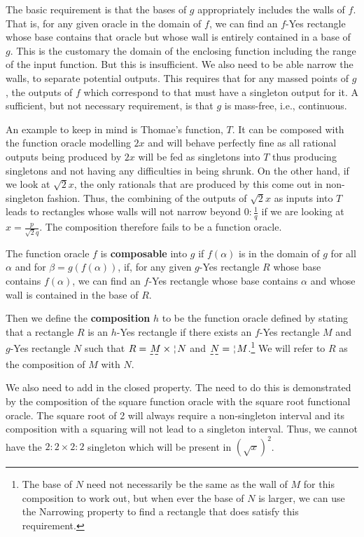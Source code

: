 \documentclass[12pt]{article}
\begin{document}
The basic requirement is that the bases of $g$ appropriately includes the walls of $f$. That is, for any given oracle in the domain of $f$, we can find an $f$-Yes rectangle whose base contains that oracle but whose wall is entirely contained in a base of $g$. This is the customary the domain of the enclosing function including the range of the input function. But this is insufficient. We also need to be able narrow the walls, to separate potential outputs. This requires that for any massed points of $g$, the outputs of $f$ which correspond to that must have a singleton output for it. A sufficient, but not necessary requirement, is that $g$ is mass-free, i.e., continuous. 

An example to keep in mind is Thomae's function, $T$. It can be composed with the function oracle modelling $2x$ and will behave perfectly fine as all rational outputs being produced by $2x$ will be fed as singletons into $T$ thus producing singletons and not having any difficulties in being shrunk.  On the other hand, if we look at $\sqrt{2} x$, the only rationals that are produced by this come out in non-singleton fashion. Thus, the combining of the outputs of $\sqrt{2} x$ as inputs into $T$ leads to rectangles whose walls will not narrow beyond $0:\frac{1}{q}$ if we are looking at $x = \frac{p}{\sqrt{2} q}$. The composition therefore fails to be a function oracle. 

The function oracle $f$ is \textbf{composable} into $g$ if $f(\alpha)$ is in the domain of $g$ for all $\alpha$ and for $\beta = g(f(\alpha))$, if, for any given $g$-Yes rectangle $R$ whose base contains $f(\alpha)$, we can find an $f$-Yes rectangle whose base contains $\alpha$ and whose wall is contained in the base of $R$.  

Then we define the \textbf{composition} $h$ to be the function oracle defined by stating that a rectangle $R$ is an $h$-Yes rectangle if there exists an $f$-Yes rectangle $M$ and $g$-Yes rectangle $N$  such that $R = \base{M} \times \wall{N}$ and $\base{N} = \wall{M}$.\footnote{The base of $N$ need not necessarily be the same as the wall of $M$ for this composition to work out, but when ever the base of $N$ is larger, we can use the Narrowing property to find a rectangle that does satisfy this requirement.} We will refer to $R$ as the composition of $M$ with $N$. 

We also need to add in the closed property. The need to do this is demonstrated by the composition of the square function oracle with the square root functional oracle. The square root of 2 will always require a non-singleton interval and its composition with a squaring will not lead to a singleton interval. Thus, we cannot have the $2:2 \times 2:2$ singleton which will be present in $(\sqrt{x})^2$.
\end{document}
